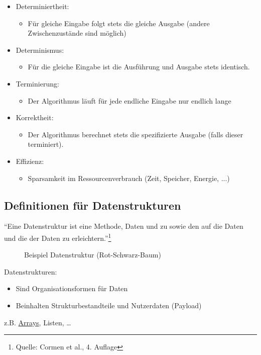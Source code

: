 \documentclass[
    12pt,
    a4paper,
    ngerman,
    color=3b,%
    marginpar=false,
    colorback=false,
    leqno,
]{tudaexercise}
\begin{document}
\begin{itemize}
    \item Determiniertheit:\begin{itemize}
              \item Für gleiche Eingabe folgt stets die gleiche Ausgabe (andere Zwischenzustände sind möglich)
          \end{itemize}
    \item Determinismus:\begin{itemize}
              \item Für die gleiche Eingabe ist die Ausführung und Ausgabe stets identisch.
          \end{itemize}
    \item Terminierung:\begin{itemize}
              \item Der Algorithmus läuft für jede endliche Eingabe nur endlich lange
          \end{itemize}
    \item Korrektheit:\begin{itemize}
              \item Der Algorithmus berechnet stets die spezifizierte Ausgabe (falls dieser
                    terminiert).
          \end{itemize}
    \item Effizienz:\begin{itemize}
              \item Sparsamkeit im Ressourcenverbrauch (Zeit, Speicher, Energie, ...)
          \end{itemize}
\end{itemize}
\subsection{Definitionen für Datenstrukturen}\label{1.3}\label{Definitionen fuer Datenstrukturen}
"`Eine Datenstruktur ist eine Methode,
Daten  und zu  sowie
den  auf die Daten und die 
der Daten zu erleichtern."'\footnote{Quelle: Cormen et al., 4. Auflage}\\
\begin{wrapfigure}[5]{r}{.6\textwidth}
    \centering
    \caption{Beispiel Datenstruktur (Rot-Schwarz-Baum)}
    \label{fig:baum_beispiel}
\end{wrapfigure}
Datenstrukturen:\begin{itemize}
    \item Sind Organisationsformen für Daten
    \item Beinhalten Strukturbestandteile und Nutzerdaten (Payload)
\end{itemize}
z.B. \hyperref[2.2]{Arrays}, Listen, \ldots
\vspace*{2cm}
\end{document}
